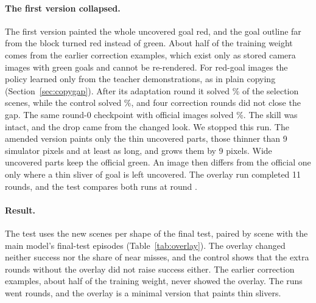 \documentclass[10pt,twocolumn,letterpaper]{article}
\begin{document}
\paragraph{The first version collapsed.}
The first version painted the whole uncovered goal red, and the goal outline far from the block turned red instead of
green. About half of the training weight comes from the earlier correction examples, which exist only as stored camera
images with green goals and cannot be re-rendered. For red-goal images the policy learned only from the teacher
demonstrations, as in plain copying (Section~\ref{sec:copygap}). After its adaptation round it solved
\numOverlayFirstRoundZero\% of the selection scenes, while the control solved \numControlRoundZero\%, and four
correction rounds did not close the gap. The same round-0 checkpoint with official images solved
\numOverlayFirstOfficial\%. The skill was intact, and the drop came from the changed look. We stopped this run. The
amended version paints only the thin uncovered parts, those thinner than 9 simulator pixels and at least as long, and
grows them by 9 pixels. Wide uncovered parts keep the official green. An image then differs from the official one only
where a thin sliver of goal is left uncovered. The overlay run completed 11 rounds, and the test compares both runs at
round \numOverlayRounds.

\paragraph{Result.}
The test uses the \numTestScenes{} new scenes per shape of the final test, paired by scene with the main model's
final-test episodes (Table~\ref{tab:overlay}). The overlay changed neither success nor the share of near misses, and
the control shows that the extra rounds without the overlay did not raise success either. The earlier correction
examples, about half of the training weight, never showed the overlay. The runs went \numOverlayRounds{} rounds, and
the overlay is a minimal version that paints thin slivers.
\end{document}

